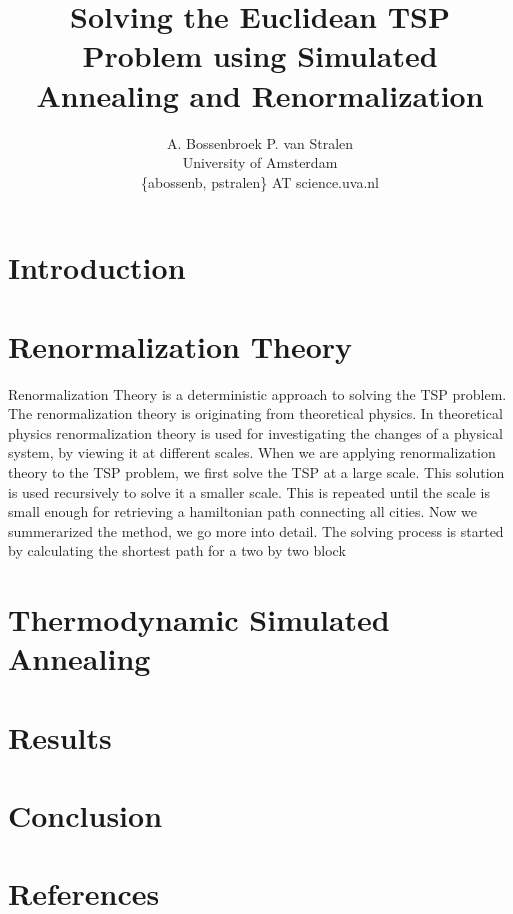 \documentclass[twocolumn]{article}
\author{A. Bossenbroek P. van Stralen\\University of Amsterdam\\\{abossenb, pstralen\} AT science.uva.nl}
\title{Solving the Euclidean TSP Problem using Simulated Annealing and Renormalization }
\begin{document}
\maketitle
\section{Introduction}
\section{Renormalization Theory}
Renormalization Theory is a deterministic approach to solving the TSP problem. The renormalization theory is originating from theoretical physics. In theoretical physics renormalization theory is used for investigating the changes of a physical system, by viewing it at different scales.
\newline\newline\noindent
When we are applying renormalization theory to the TSP problem, we first solve the TSP at a large scale. This solution is used recursively to solve it a smaller scale. This is repeated until the scale is small enough for retrieving a hamiltonian path connecting all cities.
\newline\newline\noindent
Now we summerarized the method, we go more into detail. The solving process is started by calculating the shortest path for a two by two block
\section{Thermodynamic Simulated Annealing}
\section{Results}
\section{Conclusion}
\section{References}
\end{document}
